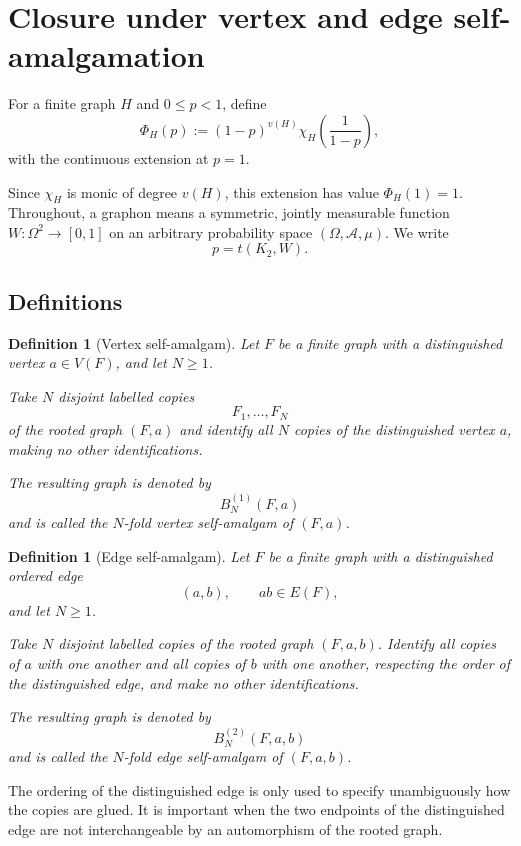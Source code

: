 \documentclass[11pt]{article}
\newtheorem{definition}[theorem]{Definition}
\begin{document}
\section{Closure under vertex and edge self-amalgamation}

For a finite graph $H$ and $0\le p<1$, define
\[
    \Phi_H(p)
    :=
    (1-p)^{v(H)}
    \chi_H\!\left(\frac{1}{1-p}\right),
\]
with the continuous extension at $p=1$.

Since $\chi_H$ is monic of degree $v(H)$, this extension has value
$\Phi_H(1)=1$.  Throughout, a graphon means a symmetric, jointly
measurable function $W:\Omega^2\to[0,1]$ on an arbitrary probability
space $(\Omega,\mathcal A,\mu)$.  We write
\[
    p=t(K_2,W).
\]

\subsection{Definitions}

\begin{definition}[Vertex self-amalgam]
Let $F$ be a finite graph with a distinguished vertex $a\in V(F)$,
and let $N\ge1$.

Take $N$ disjoint labelled copies
\[
    F_1,\dots,F_N
\]
of the rooted graph $(F,a)$ and identify all $N$ copies of the
distinguished vertex $a$, making no other identifications.

The resulting graph is denoted by
\[
    B_N^{(1)}(F,a)
\]
and is called the $N$-fold vertex self-amalgam of $(F,a)$.
\end{definition}

\begin{definition}[Edge self-amalgam]
Let $F$ be a finite graph with a distinguished ordered edge
\[
    (a,b),
    \qquad ab\in E(F),
\]
and let $N\ge1$.

Take $N$ disjoint labelled copies of the rooted graph $(F,a,b)$.
Identify all copies of $a$ with one another and all copies of $b$
with one another, respecting the order of the distinguished edge,
and make no other identifications.

The resulting graph is denoted by
\[
    B_N^{(2)}(F,a,b)
\]
and is called the $N$-fold edge self-amalgam of $(F,a,b)$.
\end{definition}

The ordering of the distinguished edge is only used to specify
unambiguously how the copies are glued. It is important when the two
endpoints of the distinguished edge are not interchangeable by an
automorphism of the rooted graph.
\end{document}
